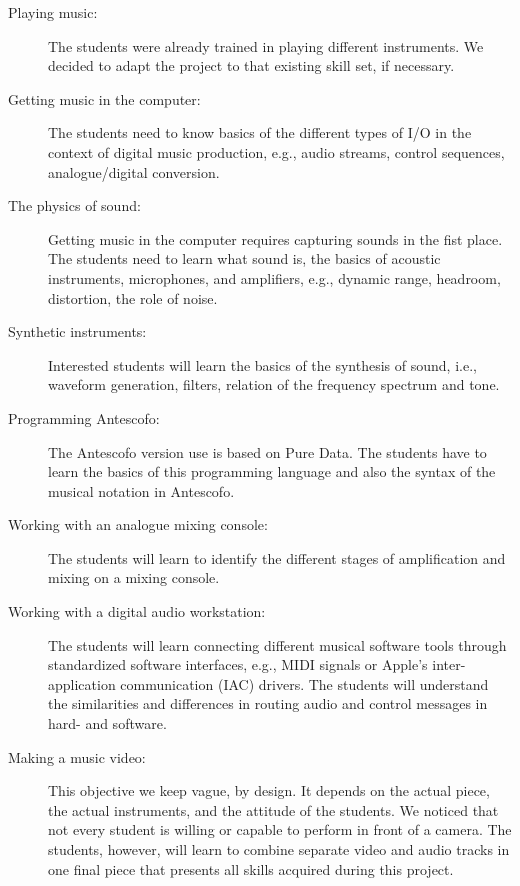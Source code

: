 \documentclass[onecolumn,nocopyrightspace,preprint]{sigplanconf}
\begin{document}
\begin{description} 

\item[Playing music:] The students were already trained in playing different
instruments. We decided to adapt the project to that existing skill set, if
necessary.

\item[Getting music in the computer:] The students need to know basics of the
different types of I/O in the context of digital music production, e.g., audio
streams, control sequences, analogue/digital conversion.

\item[The physics of sound:] Getting music in the computer requires capturing
sounds in the fist place. The students need to learn what sound is, the basics
of acoustic instruments, microphones, and amplifiers, e.g., dynamic range,
headroom, distortion, the role of noise.

\item[Synthetic instruments:] Interested students will learn the basics of the
synthesis of sound, i.e., waveform generation, filters, relation of the
frequency spectrum and tone.

\item[Programming Antescofo:] The Antescofo version use is based on Pure Data.
The students have to learn the basics of this programming language and also
the syntax of the musical notation in Antescofo.

\item[Working with an analogue mixing console:] The students will learn to
identify the different stages of amplification and mixing on a mixing console.

\item[Working with a digital audio workstation:] The students will learn
connecting different musical software tools through standardized software
interfaces, e.g., MIDI signals or Apple's inter-application communication
(IAC) drivers. The students will understand the similarities and differences
in routing audio and control messages in hard- and software.

\item[Making a music video:] This objective we keep vague, by design. It
depends on the actual piece, the actual instruments, and the attitude of the
students. We noticed that not every student is willing or capable to perform
in front of a camera. The students, however, will learn to combine separate
video and audio tracks in one final piece that presents all skills acquired
during this project.

\end{description}
\end{document}
